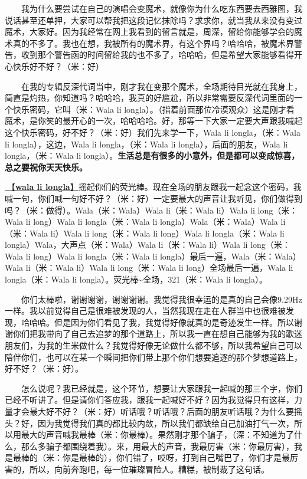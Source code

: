 \documentclass[]{ctexbook}
\begin{document}
  我为什么要尝试在自己的演唱会变魔术，就像你为什么吃东西要去西雅图，我说话甚至还单押，大家可以帮我把这段记忆抹除吗？求求你，就当我从来没有变过魔术，大家好。因为我经常在网上我看到的留言就是，周深，留给你能够学会的魔术真的不多了。我也在想，我被所有的魔术界，有这个界吗？哈哈哈，被魔术界警告，收到那个警告函的时间留给我的也不多了，哈哈哈，但是希望大家能够看得开心快乐好不好？（米：好）

  在我的专辑反深代词当中，刚才我在变那个魔术，全场期待目光就在我身上，简直是灼热，你知道吗？哈哈哈，我真的好尴尬，所以非常需要反深代词里面的一个快乐密码，它叫（米：Wala li longla）。（指着前面那位冷漠观众）这是刚才看魔术，是你笑的最开心的一次，哈哈哈哈。好，那等一下大家一定要大声跟我喊起这个快乐密码，好不好？（米：好）我们先来学一下，Wala li longla，（米：Wala li longla），这边，Wala li longla，（米：Wala li longla），后面的朋友，Wala li longla，（米：Wala li longla）。\textbf{生活总是有很多的小意外，但是都可以变成惊喜，总之要祝你天天快乐。}

\hyperref[wala-li-longla]{🎵【\textbf{wala li longla}】}摇起你们的荧光棒。现在全场的朋友跟我一起念这个密码，我喊一句，你们喊一句好不好？（米：好）一定要最大的声音让我听见，你们做得到吗？（米：做得）。Wala（米：Wala）Wala li（米：Wala li）Wala li long（米：Wala li long）Wala li longla（米：Wala li longla）Wala（米：Wala）Wala li（米：Wala li）Wala li long（米：Wala li long）Wala li longla（米：Wala li longla）Wala，大声点（米：Wala）Wala li（米：Wala li）Wala li long（米：Wala li long）Wala li longla（米：Wala li longla）最后一遍，Wala（米：Wala）Wala li（米：Wala li）Wala li long（米：Wala li long）全场最后一遍，Wala li longla（米：Wala li longla）。荧光棒\textasciitilde 全场，321（米：Wala li longla）。

  你们太棒啦，谢谢谢谢，谢谢谢谢。我觉得我很幸运的是真的自己会像9.29Hz一样。我以前觉得自己是很难被发现的人，当然我现在走在人群当中也很难被发现，哈哈哈。但是因为你们看见了我，我觉得好像就真的是奇迹发生一样。所以谢谢你们把我带向了自己去追梦的那个道路上，所以我一直在想自己能够为我的歌迷朋友们，为我的生米做什么？我觉得好像无论做什么都不够，所以我希望自己可以陪伴你们，也可以在某一个瞬间把你们带上那个你们想要追逐的那个梦想道路上，好不好？（米：好）。

  怎么说呢？我已经就是，这个环节，想要让大家跟我一起喊的那三个字，你们已经不听讲了。但是请你们答应我，跟我一起喊好不好？因为我觉得只有这样，力量才会最大好不好？（米：好）听话哦？听话哦？后面的朋友听话哦？为什么要摇头？好，因为我觉得我们真的都比较内敛，所以我们都缺给自己加油打气一次，所以用最大的声音喊我最棒（米：你最棒）。果然刚才那个骗子，（深：不知道为了什么，那么多骗子都围绕着我）。来，用最大的声音，我最厉害（米：你最厉害），我是最棒的（米：你是最棒的），你们错了，哎呀，打到自己嘴巴了，你们才是最厉害的，所以，向前奔跑吧，每一位璀璨冒险人。糟糕，被制裁了这句话。
\end{document}
